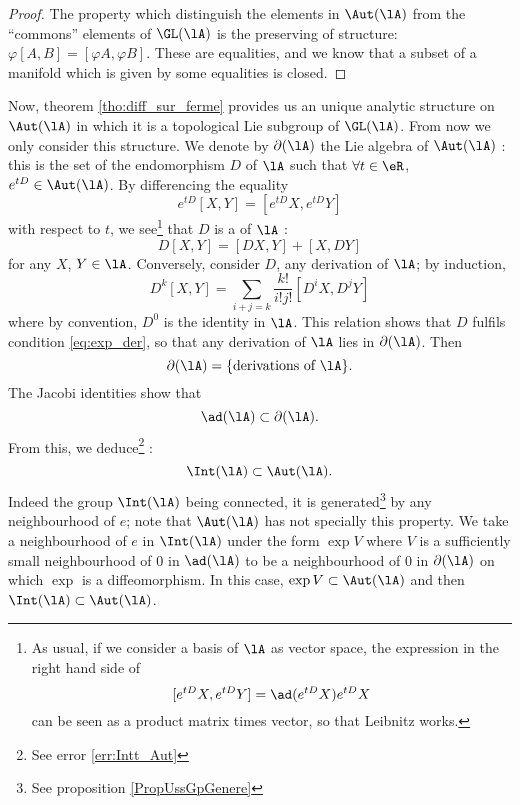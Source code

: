 \begin{proof}
The property which distinguish the elements in $\Aut(\lA)$ from the ``commons'' elements of $\GL(\lA)$ is the preserving of structure: $\varphi[A,B]=[\varphi A,\varphi B]$. These are equalities, and we know that a subset of a manifold which is given by some equalities is closed.
\end{proof}

Now, theorem \ref{tho:diff_sur_ferme} provides us an unique analytic structure on $\Aut(\lA)$ in which it is a topological Lie subgroup of $\GL(\lA)$. From now we only consider this structure. We denote by $\partial(\lA)$ the Lie algebra of $\Aut(\lA)$ : this is the set of the endomorphism $D$ of $\lA$ such that $\forall t\in\eR$, $e^{tD}\in\Aut(\lA)$. By differencing the equality
\begin{equation}\label{eq:exp_der}
  e^{tD}[X,Y]=[e^{tD}X,e^{tD}Y]
\end{equation}
with respect to $t$, we see\footnote{As usual, if we consider a basis of $\lA$ as vector space, the expression in the right hand side of \[[e^{tD}X,e^{tD}Y]=\ad(e^{tD}X)e^{tD}X\] can be seen as a product matrix times vector, so that Leibnitz works.} that $D$ is a  of $\lA$ :
\begin{equation}
  D[X,Y]=[DX,Y]+[X,DY]
\end{equation}
for any $X$, $Y\in\lA$. Conversely, consider $D$, any derivation of $\lA$; by induction, 
\begin{equation}
   D^k[X,Y]=\sum_{i+j=k}\frac{k!}{i!j!}[D^iX,D^jY]
\end{equation}
where by convention, $D^0$ is the identity in $\lA$. This relation shows that $D$ fulfils condition \eqref{eq:exp_der}, so that any derivation of $\lA$ lies in $\partial(\lA)$. Then
\[
  \partial(\lA)=\{\text{derivations of }\lA\}.
\]
The Jacobi identities show that 
\[
\ad(\lA)\subset\partial(\lA).    \label{pg:ad_subset_der}
\]
From this, we deduce\footnote{See error \ref{err:Intt_Aut}} :
\begin{equation}\label{eq:int_sub_aut}
  \Int(\lA)\subset\Aut(\lA).
\end{equation}
Indeed the group $\Int(\lA)$ being connected, it is generated\footnote{See proposition \ref{PropUssGpGenere}} by any neighbourhood of $e$; note that $\Aut(\lA)$ has not specially this property. We take a neighbourhood of $e$ in $\Int(\lA)$ under the form  $\exp V$  where $V$ is a sufficiently small neighbourhood of $0$ in $\ad(\lA)$ to be a neighbourhood of $0$ in $\partial(\lA)$ on which $\exp$ is a diffeomorphism. In this case, $\exp V\subset\Aut(\lA)$ and then $\Int(\lA)\subset\Aut(\lA)$.

